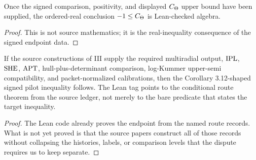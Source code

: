 \begin{theorem}
  \label{thm:ctheta-lower-bound-from-signed-data}
  \leanok
  Once the signed comparison, \qPilot{} positivity, and displayed
  \(C_\Theta\) upper bound have been supplied, the ordered-real conclusion
  \(-1\le C_\Theta\) is Lean-checked algebra.
\end{theorem}

\begin{proof}
  This is not source mathematics; it is the real-inequality consequence of the
  signed endpoint data.
\end{proof}

\begin{corollary}
  \label{cor:conditional-corollary-312}
  \notready
  If the source constructions of \IUT{} III supply the required
  multiradial output, \(\mathrm{IPL}\), \(\mathrm{SHE}\), \(\mathrm{APT}\), hull-plus-determinant
  comparison, log-Kummer upper-semi compatibility, and packet-normalized
  calibrations, then the Corollary 3.12-shaped signed pilot inequality follows.
  The Lean tag points to the conditional route theorem from the source ledger,
  not merely to the bare predicate that states the target inequality.
\end{corollary}

\begin{proof}
  The Lean code already proves the endpoint from the named route records.
  What is not yet proved is that the source papers construct all of those
  records without collapsing the histories, labels, or comparison levels that
  the dispute requires us to keep separate.
\end{proof}
